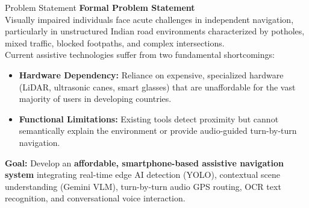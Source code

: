 \begin{frame}{Problem Statement}
{\large\textbf{\textcolor{MyUnivGreen}{Formal Problem Statement}}}\\[8pt]

Visually impaired individuals face acute challenges in independent navigation, particularly in unstructured Indian road environments characterized by potholes, mixed traffic, blocked footpaths, and complex intersections.\\[8pt]

Current assistive technologies suffer from two fundamental shortcomings:
\begin{itemize}
    \item \textbf{Hardware Dependency:} Reliance on expensive, specialized hardware (LiDAR, ultrasonic canes, smart glasses) that are unaffordable for the vast majority of users in developing countries.
    \item \textbf{Functional Limitations:} Existing tools detect proximity but cannot semantically explain the environment or provide audio-guided turn-by-turn navigation.
\end{itemize}

\vspace{6pt}
\textbf{Goal:} Develop an \textbf{affordable, smartphone-based assistive navigation system} integrating real-time edge AI detection (YOLO), contextual scene understanding (Gemini VLM), turn-by-turn audio GPS routing, OCR text recognition, and conversational voice interaction.
\end{frame}